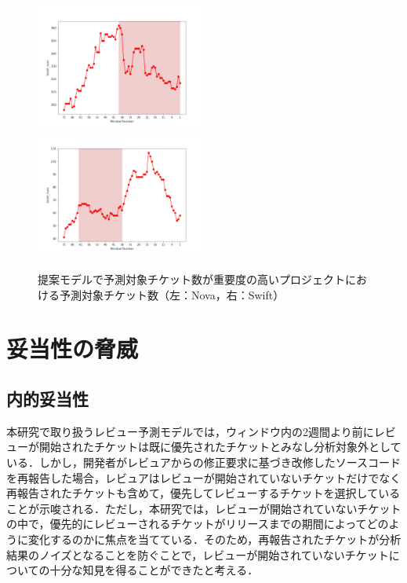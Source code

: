 \documentclass[submit]{ipsj}
\begin{document}
\begin{figure}[H]
\begin{center}
    \includegraphics[width=0.495\textwidth]{Uenaka_fig/RQ2_kousatu/Nova_ticket_num.pdf}
    \includegraphics[width=0.495\textwidth]{Uenaka_fig/RQ2_kousatu/Swift_ticket_num_merge.pdf}
    \caption{提案モデルで予測対象チケット数が重要度の高いプロジェクトにおける予測対象チケット数（左：Nova，右：Swift）}
    \label{fig:merge_ticket_num}
\end{center}
\end{figure}


\chapter{妥当性の脅威}\label{sec:disc}

\section{内的妥当性}
本研究で取り扱うレビュー予測モデルでは，ウィンドウ内の2週間より前にレビューが開始されたチケットは既に優先されたチケットとみなし分析対象外としている．しかし，開発者がレビュアからの修正要求に基づき改修したソースコードを再報告した場合，レビュアはレビューが開始されていないチケットだけでなく再報告されたチケットも含めて，優先してレビューするチケットを選択していることが示唆される．ただし，本研究では，レビューが開始されていないチケットの中で，優先的にレビューされるチケットがリリースまでの期間によってどのように変化するのかに焦点を当てている．そのため，再報告されたチケットが分析結果のノイズとなることを防ぐことで，レビューが開始されていないチケットについての十分な知見を得ることができたと考える．
\end{document}
